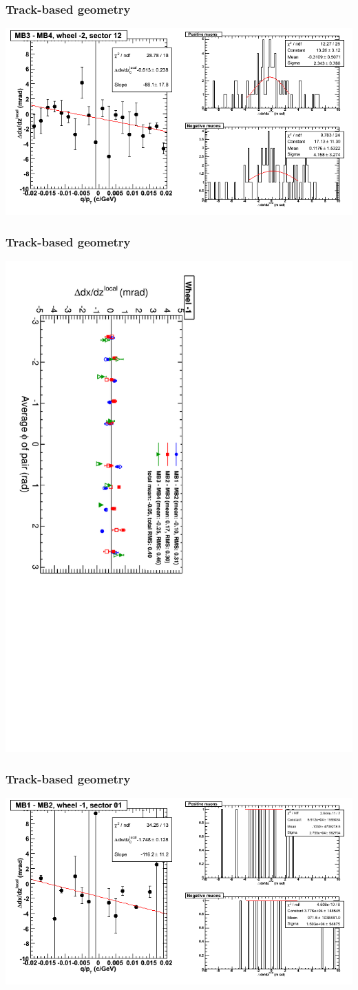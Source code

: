 \documentclass[compress]{beamer}
\begin{document}
\begin{frame}
\frametitle{Track-based geometry}
\includegraphics[width=\linewidth]{NOV4_segdiffs/dt13_slope_A_12_34.png}
\end{frame}

\begin{frame}
\frametitle{Track-based geometry}
\includegraphics[height=\linewidth, angle=90]{NOV4_segdiff_dxdz_whm1.pdf}
\end{frame}

\begin{frame}
\frametitle{Track-based geometry}
\includegraphics[width=\linewidth]{NOV4_segdiffs/dt13_slope_B_01_12.png}
\end{frame}
\end{document}
